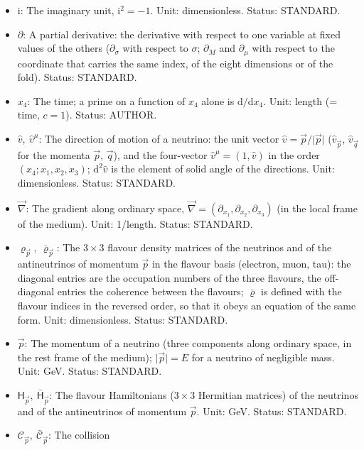 \documentclass[
  10pt,
]{article}
\providecommand{\tightlist}{%
  \setlength{\itemsep}{0pt}\setlength{\parskip}{0pt}}
\begin{document}
\begin{itemize}
\tightlist
\item
  \(\mathrm{i}\): The imaginary unit, \(\mathrm{i}^2 = -1\). Unit:
  dimensionless. Status: STANDARD.
\item
  \(\partial\): A partial derivative: the derivative with respect to one
  variable at fixed values of the others (\(\partial_\sigma\) with
  respect to \(\sigma\); \(\partial_M\) and \(\partial_\mu\) with
  respect to the coordinate that carries the same index, of the eight
  dimensions or of the fold). Status: STANDARD.
\item
  \(x_4\): The time; a prime on a function of \(x_4\) alone is
  \(\mathrm{d}/\mathrm{d}x_4\). Unit: length (= time, \(c = 1\)).
  Status: AUTHOR.
\item
  \(\hat v,\ \hat v^\mu\): The direction of motion of a neutrino: the
  unit vector \(\hat v = \vec p/\lvert\vec p\rvert\)
  (\(\hat v_{\vec p}\), \(\hat v_{\vec q}\) for the momenta \(\vec p\),
  \(\vec q\)), and the four-vector \(\hat v^\mu = (1, \hat v)\) in the
  order \((x_4; x_1, x_2, x_3)\); \(\mathrm{d}^2\hat v\) is the element
  of solid angle of the directions. Unit: dimensionless. Status:
  STANDARD.
\item
  \(\vec\nabla\): The gradient along ordinary space,
  \(\vec\nabla = (\partial_{x_1}, \partial_{x_2}, \partial_{x_3})\) (in
  the local frame of the medium). Unit: 1/length. Status: STANDARD.
\item
  \(\varrho_{\vec p},\ \bar\varrho_{\vec p}\): The \(3 \times 3\)
  flavour density matrices of the neutrinos and of the antineutrinos of
  momentum \(\vec p\) in the flavour basis (electron, muon, tau): the
  diagonal entries are the occupation numbers of the three flavours, the
  off-diagonal entries the coherence between the flavours;
  \(\bar\varrho\) is defined with the flavour indices in the reversed
  order, so that it obeys an equation of the same form. Unit:
  dimensionless. Status: STANDARD.
\item
  \(\vec p\): The momentum of a neutrino (three components along
  ordinary space, in the rest frame of the medium);
  \(\lvert\vec p\rvert = E\) for a neutrino of negligible mass. Unit:
  GeV. Status: STANDARD.
\item
  \(\mathsf{H}_{\vec p},\ \bar{\mathsf{H}}_{\vec p}\): The flavour
  Hamiltonians (\(3 \times 3\) Hermitian matrices) of the neutrinos and
  of the antineutrinos of momentum \(\vec p\). Unit: GeV. Status:
  STANDARD.
\item
  \(\mathcal{C}_{\vec p},\ \bar{\mathcal{C}}_{\vec p}\): The collision

\end{itemize}
\end{document}
